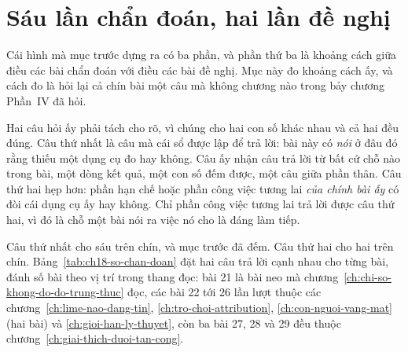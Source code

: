 \section{Sáu lần chẩn đoán, hai lần đề nghị}
\label{sec:ch18-chan-doan-va-de-nghi}

%
Cái hình mà mục trước dựng ra có ba phần, và phần thứ ba là khoảng cách giữa điều
các bài chẩn đoán với điều các bài đề nghị. Mục này đo khoảng cách ấy, và cách đo
là hỏi lại cả chín bài một câu mà không chương nào trong bảy chương Phần~IV đã
hỏi.

%
Hai câu hỏi ấy phải tách cho rõ, vì chúng cho hai con số khác nhau và cả hai đều
đúng. Câu thứ nhất là câu mà cái sổ được lập để trả lời: bài này có \emph{nói} ở
đâu đó rằng thiếu một dụng cụ đo hay không. Câu ấy nhận câu trả lời từ bất cứ chỗ
nào trong bài, một dòng kết quả, một con số đếm được, một câu giữa phần thân. Câu
thứ hai hẹp hơn: phần hạn chế hoặc phần công việc tương lai \emph{của chính bài
ấy} có đòi cái dụng cụ ấy hay không. Chỉ phần công việc tương lai trả lời được
câu thứ hai, vì đó là chỗ một bài nói ra việc nó cho là đáng làm tiếp.

Câu thứ nhất cho sáu trên chín, và mục trước đã đếm. Câu thứ hai cho hai trên
chín. Bảng~\ref{tab:ch18-so-chan-doan} đặt hai câu trả lời cạnh nhau cho từng
bài, đánh số bài theo vị trí trong thang đọc: bài 21 là bài neo mà
chương~\ref{ch:chi-so-khong-do-do-trung-thuc} đọc, các bài 22 tới 26 lần lượt
thuộc các chương~\ref{ch:lime-nao-dang-tin}, \ref{ch:tro-choi-attribution},
\ref{ch:con-nguoi-vang-mat} (hai bài) và \ref{ch:gioi-han-ly-thuyet}, còn ba bài
27, 28 và 29 đều thuộc chương~\ref{ch:giai-thich-duoi-tan-cong}.

